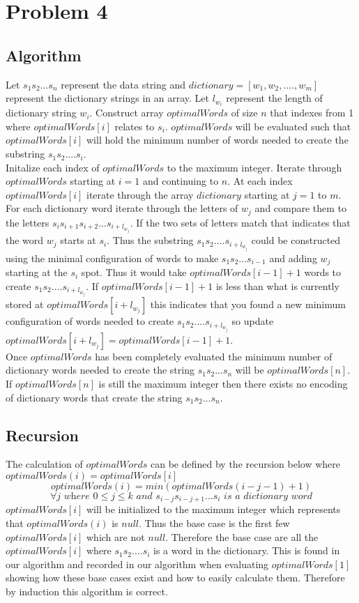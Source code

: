 \documentclass[11pt]{article}
\begin{document}
\section*{Problem 4} 

\subsection*{Algorithm}
Let $s_1s_2 ... s_{n}$ represent the data string and $dictionary = [w_1,w_2,.... ,w_m]$ represent the dictionary strings in an array. Let $l_{w_i}$ represent the length of dictionary string $w_i$. Construct array $optimalWords$ of size $n$ that indexes from 1 where $optimalWords[i]$ relates to $s_i$. $optimalWords$ will be evaluated such that $optimalWords[i]$ will hold the minimum number of words needed to create the substring $s_1s_2....s_i$. \\

Initalize each index of $optimalWords$ to the maximum integer. Iterate through $optimalWords$ starting at $i=1$ and continuing to $n$. At each index $optimalWords[i]$ iterate through the array $dictionary$ starting at $j=1$ to $m$. For each dictionary word iterate through the letters of $w_j$ and compare them to the letters $s_is_{i+1}s_{i+2}... s_{i+l_{w_j}}$. If the two sets of letters match that indicates that the word $w_j$ starts at $s_i$. Thus the substring $s_1s_2....s_{i+l_{w_j}}$ could be constructed using the minimal configuration of words to make $s_1s_2...s_{i-1}$ and adding $w_j$ starting at the $s_i$ spot. Thus it would take $optimalWords[i-1] + 1$ words to create $s_1s_2....s_{i+l_{w_j}}$. If $optimalWords[i-1] + 1$ is less than what is currently stored at $optimalWords[i+l_{w_j}]$ this indicates that you found a new minimum configuration of words needed to create $s_1s_2....s_{i+l_{w_j}}$ so update $optimalWords[i+l_{w_j}] = optimalWords[i-1] + 1$. \\ 

Once $optimalWords$ has been completely evaluated the minimum number of dictionary words needed to create the string $s_1s_2...s_n$ will be $optimalWords[n]$. If $optimalWords[n]$ is still the maximum integer then there exists no encoding of dictionary words that create the string $s_1s_2...s_n$.

\subsection*{Recursion}
The calculation of $optimalWords$ can be defined by the recursion below where $optimalWords(i) = optimalWords[i]$ 
\[optimalWords(i) = min(optimalWords(i-j-1) +1)\]
\[\forall j \textit{ where } 0 \leq j \leq k \textit{ and } s_{i-j}s_{i-j+1}...s_{i} \textit{ is a dictionary word}\]
$optimalWords[i]$ will be initialized to the maximum integer which represents that $optimalWords(i)$ is $null$. Thus the base case is the first few $optimalWords[i]$ which are not $null$. Therefore the base case are all the $optimalWords[i]$ where $s_1s_2....s_i$ is a word in the dictionary. This is found in our algorithm and recorded in our algorithm when evaluating $optimalWords[1]$ showing how these base cases exist and how to easily calculate them. Therefore by induction this algorithm is correct.
\end{document}
